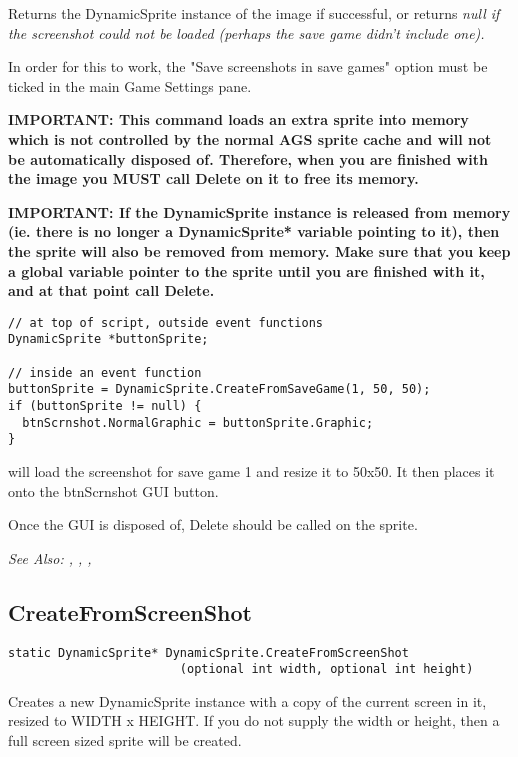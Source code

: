 Returns the DynamicSprite instance of the image if successful, or returns \it{null} if
the screenshot could not be loaded (perhaps the save game didn't include one).

In order for this to work, the "Save screenshots in save games" option must be ticked
in the main Game Settings pane.

\bf{IMPORTANT:} This command loads an extra sprite into memory which is not controlled
by the normal AGS sprite cache and will not be automatically disposed of. Therefore, when
you are finished with the image you \bf{MUST} call Delete on it to free its memory.

\bf{IMPORTANT:} If the DynamicSprite instance is released from memory (ie. there is
no longer a DynamicSprite* variable pointing to it), then the sprite will also be
removed from memory. Make sure that you keep a global variable pointer to the sprite
until you are finished with it, and at that point call Delete.

\begin{verbatim}
// at top of script, outside event functions
DynamicSprite *buttonSprite;

// inside an event function
buttonSprite = DynamicSprite.CreateFromSaveGame(1, 50, 50);
if (buttonSprite != null) {
  btnScrnshot.NormalGraphic = buttonSprite.Graphic;
}
\end{verbatim}
will load the screenshot for save game 1 and resize it to 50x50. It then places it onto
the btnScrnshot GUI button.

Once the GUI is disposed of, Delete should be called on the sprite.

\it{See Also:} ,
,
,


\subsection{CreateFromScreenShot}\label{DynamicSprite.CreateFromScreenShot}%

\begin{verbatim}
static DynamicSprite* DynamicSprite.CreateFromScreenShot
                        (optional int width, optional int height)
\end{verbatim}
Creates a new DynamicSprite instance with a copy of the current screen in it,
resized to WIDTH x HEIGHT. If you do not supply the width or height, then a full screen
sized sprite will be created.

